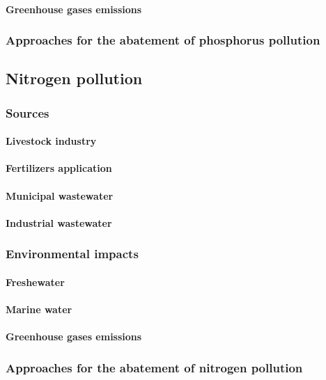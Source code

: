 \paragraph{Greenhouse gases emissions}

\subsubsection{Approaches for the abatement of phosphorus pollution}


\subsection{Nitrogen pollution}

\subsubsection{Sources}
\paragraph{Livestock industry}
\paragraph{Fertilizers application}
\paragraph{Municipal wastewater}
\paragraph{Industrial wastewater}

\subsubsection{Environmental impacts}

\paragraph{Freshewater}
\paragraph{Marine water}
\paragraph{Greenhouse gases emissions}

\subsubsection{Approaches for the abatement of nitrogen pollution}

